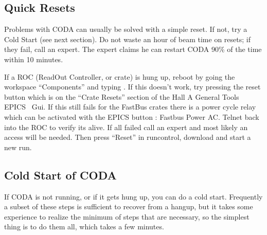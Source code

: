 {\begin{itemize}
\end{itemize}

\subsection{ Quick Resets }

Problems with CODA can usually be solved with a simple
reset.  If not, try a Cold Start (see next section).
Do not waste an hour of beam time on resets; 
if they fail, call an expert.  
The expert claims he can restart CODA 
90\% of the time within 10 minutes.

If a ROC (ReadOut Controller, or crate)
is hung up, reboot by going the workspace
``Components'' and typing .  If this 
doesn't work, try pressing the reset button 
which is on the ``Crate Resets'' section of the
Hall A General Tools EPICS~\cite{EPICSwww} Gui. 
If this still fails for the FastBus crates there is a power cycle relay
which can be activated with the EPICS button : Fastbus Power AC.
 Telnet back into
the ROC to verify its alive. 
If all failed call an expert and most likely an access will be needed.
Then press ``Reset''
in runcontrol, download and start a new run.

\subsection{ Cold Start of CODA}

\par
If CODA is not running, or if it gets hung up,
you can do a cold start.  Frequently a subset of
these steps is sufficient to recover from a hangup,
but it takes some experience to realize the
minimum of steps that
are necessary, so the simplest 
thing is to do them all, which takes a few minutes.

}
